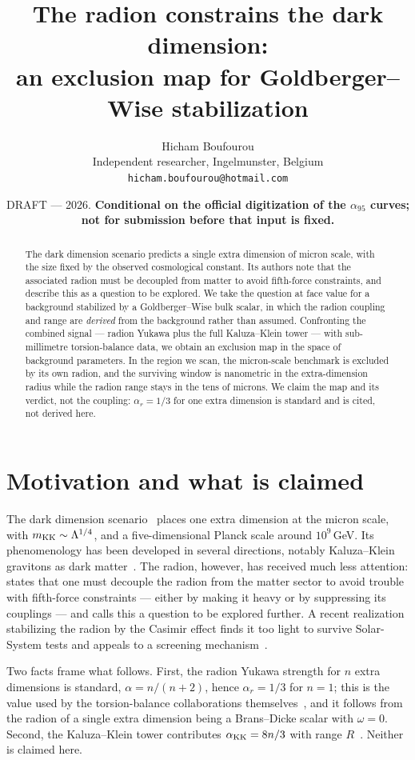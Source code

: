 \documentclass[11pt,a4paper]{article}
\title{The radion constrains the dark dimension:\\
an exclusion map for Goldberger--Wise stabilization}
\author{Hicham Boufourou\\[2pt]
\small Independent researcher, Ingelmunster, Belgium\\
\small \texttt{hicham.boufourou@hotmail.com}}
\date{DRAFT --- 2026. \textbf{Conditional on the official digitization of the
$\alpha_{95}$ curves; not for submission before that input is fixed.}}
\begin{document}
\maketitle

\begin{abstract}
The dark dimension scenario predicts a single extra dimension of
micron scale, with the size fixed by the observed cosmological
constant. Its authors note that the associated radion must be
decoupled from matter to avoid fifth-force constraints, and describe
this as a question to be explored. We take the question at face value
for a background stabilized by a Goldberger--Wise bulk scalar, in
which the radion coupling and range are \emph{derived} from the
background rather than assumed. Confronting the combined signal ---
radion Yukawa plus the full Kaluza--Klein tower --- with sub-millimetre
torsion-balance data, we obtain an exclusion map in the space of
background parameters. In the region we scan, the micron-scale
benchmark is excluded by its own radion, and the surviving window is
nanometric in the extra-dimension radius while the radion range stays
in the tens of microns. We claim the map and its verdict, not the
coupling: $\alpha_r=1/3$ for one extra dimension is standard and is
cited, not derived here.
\end{abstract}

\section{Motivation and what is claimed}

The dark dimension scenario~\cite{MVV} places one extra dimension at
the micron scale, with $m_{\rm KK}\sim\Lambda^{1/4}$, and a
five-dimensional Planck scale around $10^9\,$GeV. Its phenomenology
has been developed in several directions, notably Kaluza--Klein
gravitons as dark matter~\cite{GMOV}. The radion, however, has received
much less attention: \cite{MVV} states that one must decouple the
radion from the matter sector to avoid trouble with fifth-force
constraints --- either by making it heavy or by suppressing its
couplings --- and calls this a question to be explored further. A recent
realization stabilizing the radion by the Casimir effect finds it too
light to survive Solar-System tests and appeals to a screening
mechanism~\cite{Cas2026}.

Two facts frame what follows. First, the radion Yukawa strength for
$n$ extra dimensions is standard, $\alpha=n/(n+2)$, hence
$\alpha_r=1/3$ for $n=1$; this is the value used by the torsion-balance
collaborations themselves~\cite{AHH}, and it follows from the radion of
a single extra dimension being a Brans--Dicke scalar with $\omega=0$.
Second, the Kaluza--Klein tower contributes $\alpha_{\rm KK}=8n/3$ with
range $R$~\cite{KS}. Neither is claimed here.
\end{document}
